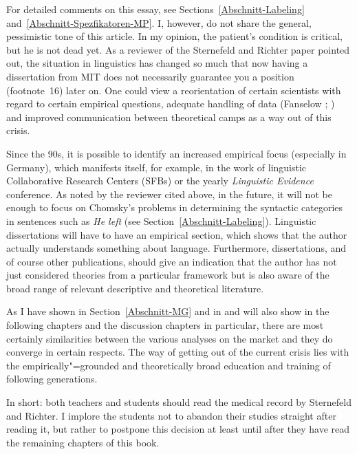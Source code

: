 {{  For detailed comments on this essay, see Sections~\ref{Abschnitt-Labeling} and~\ref{Abschnitt-Spezfikatoren-MP}.
}
I, however, do not share the general, pessimistic tone of this article. In my opinion, the patient's condition is critical, but he is not dead yet.
As a reviewer of the Sternefeld and Richter paper pointed out, the situation in linguistics has changed so much that now having a dissertation from 
MIT does not necessarily guarantee you a position (footnote~16) later on. One could view a reorientation of certain scientists with regard to certain empirical
questions, adequate handling of data (Fanselow \citeyear{Fanselow2004b}; \citeyear[]{Fanselow2009a}) and improved communication between
theoretical camps as a way out of this crisis.

Since the 90s, it is possible to identify an increased empirical focus (especially in Germany),
which manifests itself, for example, in the work of linguistic Collaborative Research Centers (SFBs)
or the yearly \emph{Linguistic Evidence} conference. As noted by the reviewer cited above, in the
future, it will not be enough to focus on Chomsky's problems in determining the syntactic categories
in sentences such as \emph{He left} (see
Section~\ref{Abschnitt-Labeling}). Linguistic dissertations will have to have an empirical section, which shows that the author actually understands
something about language. Furthermore, dissertations, and of course other publications, should give an indication that the author has not just
considered theories from a particular framework but is also aware of the broad range of relevant descriptive and theoretical literature.
}

\begin{mdframed}[style=greyexercisenologo]
As I have shown in Section~\ref{Abschnitt-MG} and in  and will also show in
the following chapters and the discussion chapters in particular, there are most certainly similarities between the various analyses on the market 
and they do converge in certain respects. The way of getting out of the current crisis lies with the
empirically"=grounded and theoretically broad education and training of following generations.

In short: both teachers and students should read the medical record by Sternefeld and Richter. I implore the students not to abandon their studies straight
after reading it, but rather to postpone this decision at least until after they have read the remaining chapters of this book.
\end{mdframed}



